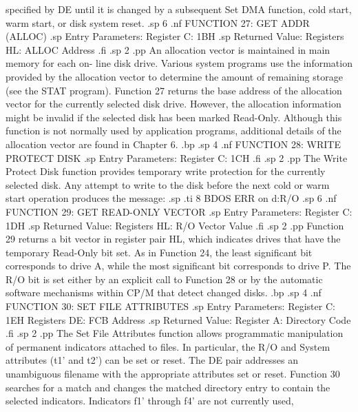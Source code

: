 specified by DE until it is changed by a subsequent Set DMA 
function, cold start, warm start, or disk system reset.
.sp 6
.nf
                 FUNCTION 27:  GET ADDR (ALLOC)
.sp
              Entry Parameters:
                    Register C:  1BH
.sp
              Returned Value:
                  Registers HL:  ALLOC Address
.fi
.sp 2
.pp
An allocation vector is maintained in main memory for each on-
line disk drive.  Various system programs use the information 
provided by the allocation vector to determine the amount of 
remaining storage (see the STAT program).  Function 27 returns 
the base address of the allocation vector for the currently 
selected disk drive.  However, the allocation information might be 
invalid if the selected disk has been marked Read-Only.  Although 
this function is not normally used by application programs, 
additional details of the allocation vector are found in Chapter 
6.
.bp
.sp 4
.nf
                FUNCTION 28:  WRITE PROTECT DISK
.sp
                    Entry Parameters:
                          Register C:  1CH
.fi
.sp 2
.pp
The Write Protect Disk function provides temporary write 
protection for the currently selected disk.  Any attempt to write 
to the disk before the next cold or warm start operation produces 
the message:
.sp
.ti 8
BDOS ERR on d:R/O
.sp 6
.nf
               FUNCTION 29:  GET READ-ONLY VECTOR
.sp
             Entry Parameters:
                   Register C:  1DH
.sp
             Returned Value:
                 Registers HL:  R/O Vector Value
.fi
.sp 2
.pp
Function 29 returns a bit vector in register pair HL, which 
indicates drives that have the temporary Read-Only bit set.  As 
in Function 24, the least significant bit corresponds to drive A, 
while the most significant bit corresponds to drive P.  The R/O 
bit is set either by an explicit call to Function 28 or by the 
automatic software mechanisms within CP/M that detect changed 
disks.
.bp
.sp 4
.nf
                FUNCTION 30:  SET FILE ATTRIBUTES
.sp
             Entry Parameters:
                   Register C:  1EH
                 Registers DE:  FCB Address
.sp
             Returned Value:
                  Register  A:  Directory Code
.fi
.sp 2
.pp
The Set File Attributes function allows programmatic manipulation 
of permanent indicators attached to files.  In particular, the R/O 
and System attributes (t1' and t2') can be set or reset.  The DE 
pair addresses an unambiguous filename with the appropriate 
attributes set or reset.  Function 30 searches for a match and 
changes the matched directory entry to contain the selected 
indicators.  Indicators f1' through f4' are not currently used, 
